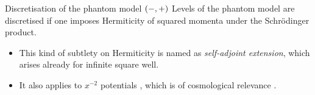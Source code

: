 \documentclass[8pt]{beamer}
\begin{document}
\begin{frame}%
{Discretisation of the phantom model ${\left(-,+\right)}$}%
Levels of the phantom model are \alert{discretised} if one imposes Hermiticity 
of squared momenta under the Schrödinger product.

\begin{itemize}
\item This kind of subtlety on Hermiticity is named as \emph{self-adjoint 
extension}, which arises already for infinite square 
well.
\item It also applies to $x^{-2}$ potentials%
, which is of cosmological relevance%
.
\end{itemize}

\end{frame}
\end{document}
